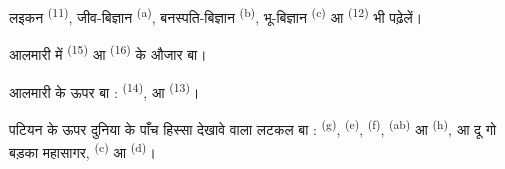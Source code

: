 लइकन  \textsuperscript{(11)}, जीव-बिज्ञान
\textsuperscript{(a)}, बनस्पति-बिज्ञान \textsuperscript{(b)},
भू-बिज्ञान \textsuperscript{(c)} आ  \textsuperscript{(12)}
भी पढ़ेलें।

आलमारी में  \textsuperscript{(15)} आ 
\textsuperscript{(16)} के औजार बा।

आलमारी के ऊपर बा :  \textsuperscript{(14)}, 
आ  \textsuperscript{(13)}।

पटियन के ऊपर दुनिया के पाँच हिस्सा देखावे वाला  लटकल बा :
 \textsuperscript{(g)},  \textsuperscript{(e)},
 \textsuperscript{(f)}, 
\textsuperscript{(ab)} आ  \textsuperscript{(h)}, आ दू गो
बड़का महासागर,  \textsuperscript{(c)} आ
 \textsuperscript{(d)}।
